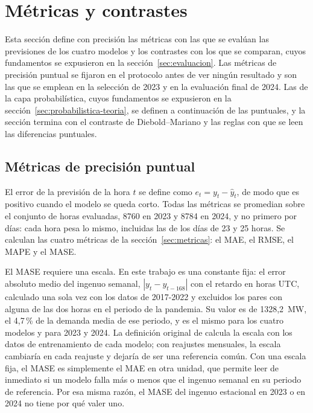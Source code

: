 \section{Métricas y contrastes}\label{sec:metricas-contrastes}

Esta sección define con precisión las métricas con las que se evalúan las
previsiones de los cuatro modelos y los contrastes con los que se comparan,
cuyos fundamentos se expusieron en la sección~\ref{sec:evaluacion}. Las
métricas de precisión puntual se fijaron en el protocolo antes de ver ningún
resultado y son las que se emplean en la selección de 2023 y en la
evaluación final de 2024. Las de la capa probabilística, cuyos fundamentos se
expusieron en la sección~\ref{sec:probabilistica-teoria}, se definen a
continuación de las puntuales, y la sección termina con el contraste de
Diebold--Mariano y las reglas con que se leen las diferencias puntuales.

\subsection{Métricas de precisión puntual}\label{sec:metricas-puntuales}

El error de la previsión de la hora $t$ se define como $e_t = y_t -
\hat{y}_t$, de modo que es positivo cuando el modelo se queda corto. Todas
las métricas se promedian sobre el conjunto de horas evaluadas, 8760 en 2023
y 8784 en 2024, y no primero por días: cada hora pesa lo mismo, incluidas las
de los días de 23 y 25 horas. Se calculan las cuatro métricas de la
sección~\ref{sec:metricas}: el MAE, el RMSE, el MAPE y el MASE.

El MASE requiere una escala. En este trabajo es una constante fija: el error
absoluto medio del ingenuo semanal, $|y_t - y_{t-168}|$ con el retardo en
horas UTC, calculado una sola vez con los datos de 2017-2022 y excluidos los
pares con alguna de las dos horas en el periodo de la pandemia. Su valor es
de 1328,2~MW, el 4,7\,\% de la demanda media de ese periodo, y es el mismo
para los cuatro modelos y para 2023 y 2024. La definición original de
\textcite{hyndman2006another} calcula la escala con los datos de
entrenamiento de cada modelo; con reajustes mensuales, la escala cambiaría en
cada reajuste y dejaría de ser una referencia común. Con una escala fija, el
MASE es simplemente el MAE en otra unidad, que permite leer de inmediato si un
modelo falla más o menos que el ingenuo semanal en su periodo de referencia.
Por esa misma razón, el MASE del ingenuo estacional en 2023 o en 2024 no
tiene por qué valer uno.

